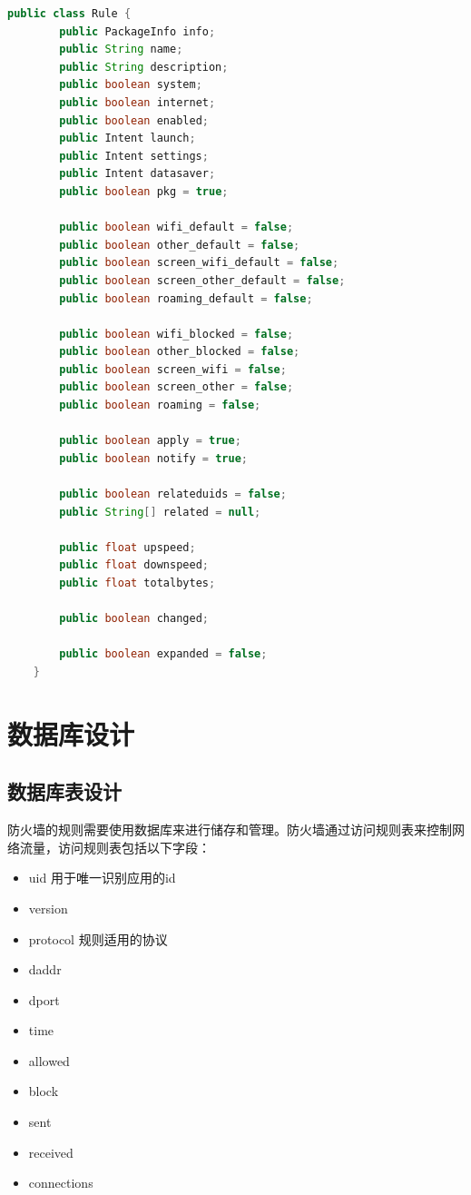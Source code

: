 \documentclass[format=final, language=chinese, degree=fyp]{hustthesis}
\begin{document}
\begin{lstlisting}[language=java]
    public class Rule {
        public PackageInfo info;
        public String name;
        public String description;
        public boolean system;
        public boolean internet;
        public boolean enabled;
        public Intent launch;
        public Intent settings;
        public Intent datasaver;
        public boolean pkg = true;

        public boolean wifi_default = false;
        public boolean other_default = false;
        public boolean screen_wifi_default = false;
        public boolean screen_other_default = false;
        public boolean roaming_default = false;

        public boolean wifi_blocked = false;
        public boolean other_blocked = false;
        public boolean screen_wifi = false;
        public boolean screen_other = false;
        public boolean roaming = false;

        public boolean apply = true;
        public boolean notify = true;

        public boolean relateduids = false;
        public String[] related = null;

        public float upspeed;
        public float downspeed;
        public float totalbytes;

        public boolean changed;

        public boolean expanded = false;
    }
\end{lstlisting}

\section{数据库设计}

\subsection{数据库表设计}
防火墙的规则需要使用数据库来进行储存和管理。防火墙通过访问规则表来控制网络流量，访问规则表包括以下字段：

\begin{itemize}
    \item uid           用于唯一识别应用的id
    \item version
    \item protocol      规则适用的协议
    \item daddr
    \item dport

    \item time
    \item allowed
    \item block

    \item sent
    \item received
    \item connections
\end{itemize}
\end{document}
